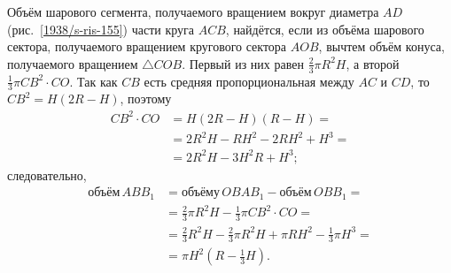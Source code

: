 Объём шарового сегмента, получаемого вращением вокруг диаметра $AD$ (рис.~\ref{1938/s-ris-155}) части круга $ACB$, найдётся, если из объёма шарового сектора, получаемого вращением кругового сектора $AOB$, вычтем объём конуса, получаемого вращением $\triangle COB$.
Первый из них равен $\tfrac23\pi R^2H$, а второй $\tfrac13\pi CB^2\cdot CO$.
Так как $CB$ есть средняя пропорциональная между $AC$ и $CD$, то $CB^2 = H(2R - H)$, поэтому
\begin{align*}
CB^2\cdot CO &= H(2R - H)(R - H)=
\\
&=2R^2H - RH^2 - 2RH^2 + H^3 =
\\
&= 2R^2H-3H^2R + H^3;
\end{align*}
следовательно, 
\begin{align*}
\text{объём}\, ABB_1
&= \text{объёму}\, OBAB_1- \text{объём}\, OBB_1=
\\
&=\tfrac23\pi R^2H -\tfrac13 \pi CB^2\cdot CO = 
\\
&=\tfrac23 R^2H - \tfrac23\pi R^2H + \pi RH^2 - \tfrac13\pi H^3 = 
\\
&= \pi H^2(R-\tfrac13H).
\end{align*}

